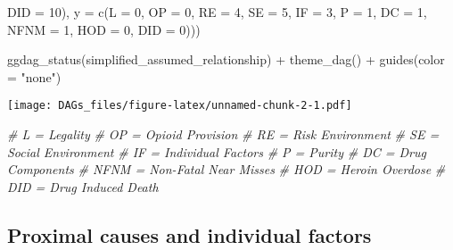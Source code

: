 \documentclass[
]{article}
\newenvironment{Shaded}{\begin{snugshade}}{\end{snugshade}}
\newcommand{\AttributeTok}[1]{\textcolor[rgb]{0.77,0.63,0.00}{#1}}
\newcommand{\CommentTok}[1]{\textcolor[rgb]{0.56,0.35,0.01}{\textit{#1}}}
\newcommand{\DecValTok}[1]{\textcolor[rgb]{0.00,0.00,0.81}{#1}}
\newcommand{\FunctionTok}[1]{\textcolor[rgb]{0.00,0.00,0.00}{#1}}
\newcommand{\NormalTok}[1]{#1}
\newcommand{\SpecialCharTok}[1]{\textcolor[rgb]{0.00,0.00,0.00}{#1}}
\newcommand{\StringTok}[1]{\textcolor[rgb]{0.31,0.60,0.02}{#1}}
\begin{document}
\begin{Shaded}
\begin{Highlighting}[]
                                                              \AttributeTok{DID =} \DecValTok{10}\NormalTok{), }
                                                        \AttributeTok{y =}  \FunctionTok{c}\NormalTok{(}\AttributeTok{L =} \DecValTok{0}\NormalTok{,}
                                                              \AttributeTok{OP =} \DecValTok{0}\NormalTok{,}
                                                              \AttributeTok{RE =} \DecValTok{4}\NormalTok{, }\AttributeTok{SE =} \DecValTok{5}\NormalTok{, }\AttributeTok{IF =} \DecValTok{3}\NormalTok{,}
                                                              \AttributeTok{P =} \DecValTok{1}\NormalTok{,}
                                                              \AttributeTok{DC =} \DecValTok{1}\NormalTok{,}
                                                              \AttributeTok{NFNM =} \DecValTok{1}\NormalTok{,}
                                                              \AttributeTok{HOD =} \DecValTok{0}\NormalTok{,}
                                                              \AttributeTok{DID =} \DecValTok{0}\NormalTok{)))}

\FunctionTok{ggdag\_status}\NormalTok{(simplified\_assumed\_relationship) }\SpecialCharTok{+}
  \FunctionTok{theme\_dag}\NormalTok{() }\SpecialCharTok{+}
  \FunctionTok{guides}\NormalTok{(}\AttributeTok{color =} \StringTok{"none"}\NormalTok{)}
\end{Highlighting}
\end{Shaded}

\texttt{[image: DAGs\_files/figure-latex/unnamed-chunk-2-1.pdf]}

\begin{Shaded}
\begin{Highlighting}[]
\CommentTok{\# L = Legality}
\CommentTok{\# OP = Opioid Provision}
\CommentTok{\# RE = Risk Environment}
\CommentTok{\# SE = Social Environment}
\CommentTok{\# IF = Individual Factors}
\CommentTok{\# P = Purity}
\CommentTok{\# DC = Drug Components}
\CommentTok{\# NFNM = Non{-}Fatal Near Misses}
\CommentTok{\# HOD = Heroin Overdose}
\CommentTok{\# DID = Drug Induced Death }
\end{Highlighting}
\end{Shaded}

\hypertarget{proximal-causes-and-individual-factors}{%
\subsection{Proximal causes and individual
factors}\label{proximal-causes-and-individual-factors}}
\end{document}
